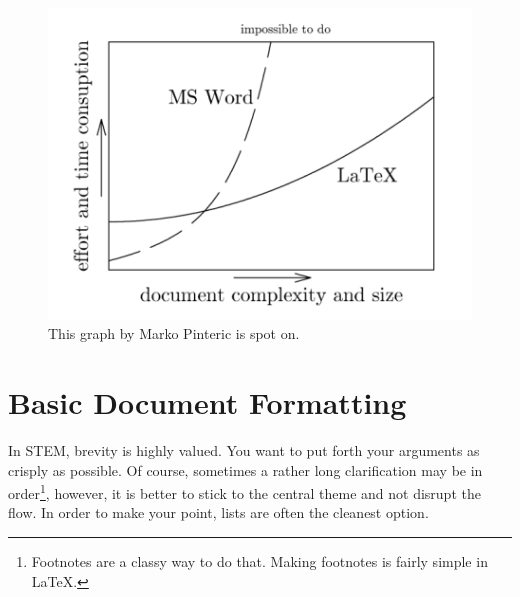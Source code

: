 \documentclass[10pt, A4]{article}
\begin{document}
	\\
	
	\begin{figure}[H]
		\centering
		\includegraphics[width=0.6\linewidth]{ease-graph.png}
		\caption{This graph by Marko Pinteric is spot on.}
	\end{figure}
	

\section{Basic Document Formatting}
\label{sec:basic}
In STEM, brevity is highly valued. You want to put forth your arguments as crisply as possible.
Of course, sometimes a rather long clarification may be in order\footnote{ Footnotes are a classy way to do that. Making footnotes is fairly simple in \LaTeX.}, however, it is better to stick
to the central theme and not disrupt the flow. In order to make your point, lists are often the
cleanest option.
\end{document}

